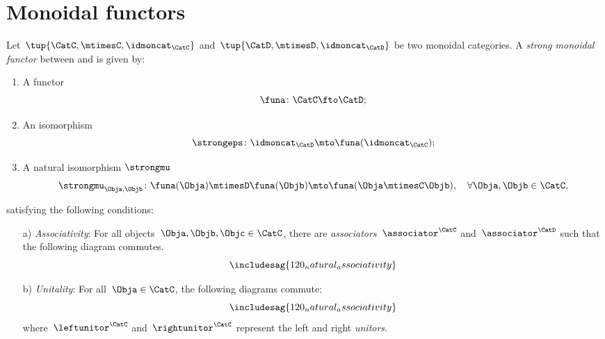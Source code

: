 

\section{Monoidal functors}
\label{sec:monoidal-functors}
\begin{ctdefinition}
    \label{def:strong-monoidal-functor}

    Let~$\tup{\CatC,\mtimesC,\idmoncat_{\CatC}}$ and~$\tup{\CatD,\mtimesD,\idmoncat_{\CatD}}$ be two monoidal categories.
    A \emph{strong monoidal functor} between \CatC and \CatD is given by:
    \begin{enumerate}
        \item A functor
        \begin{equation}
            \funa \colon \CatC \fto \CatD;
        \end{equation}
        \item An isomorphism
        \begin{equation}
            \strongeps\colon \idmoncat_{\CatD}\mto \funa(\idmoncat_{\CatC});
        \end{equation}
        \item A natural isomorphism $\strongmu$
        \begin{equation}
            \strongmu_{\Obja,\Objb}\colon \funa(\Obja)\mtimesD \funa(\Objb) \mto \funa(\Obja \mtimesC \Objb),\quad \forall \Obja,\Objb\in \CatC,
        \end{equation}
    \end{enumerate}
    satisfying the following conditions:
    \begin{enumerate}
        \item[a)] \emph{Associativity}: For all objects~$\Obja,\Objb,\Objc\in \CatC$,
        there are  \emph{associators}~$\associator^\CatC$ and~$\associator^\CatD$ such that
        the following diagram commutes.
        \begin{equation}
            \label{eq:120_natural_associativity}
            \includesag{120_natural_associativity}
        \end{equation}

        \item[b)] \emph{Unitality}: For all~$\Obja\in \CatC$, the following diagrams commute:
        \begin{equation}
            \label{eq:120_natural_associativity}
            \includesag{120_natural_associativity}
        \end{equation}
        where~$\leftunitor^\CatC$ and~$\rightunitor^\CatC$ represent the left and right \emph{unitors}.
    \end{enumerate}
\end{ctdefinition}

